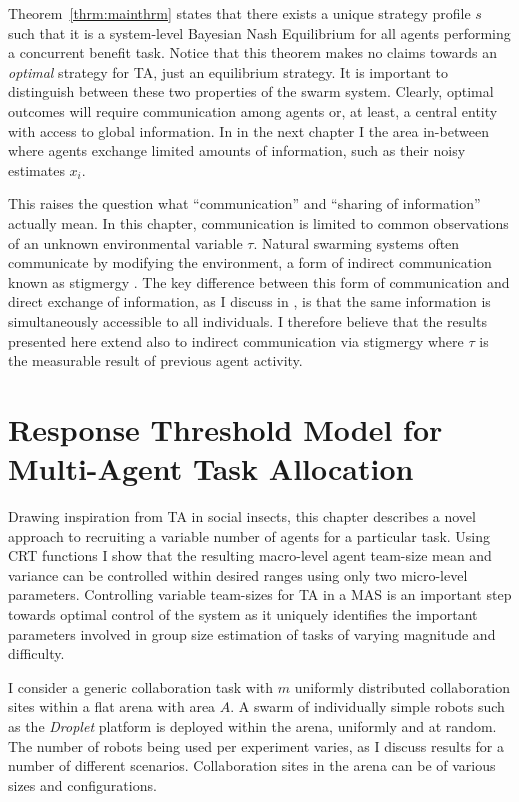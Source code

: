 \documentclass[12pt]{book}
\begin{document}
Theorem~\ref{thrm:mainthrm} states that there exists a unique strategy profile $s$ such that it is a system-level Bayesian Nash Equilibrium for all agents performing a concurrent benefit task. Notice that this theorem makes no claims towards an \emph{optimal} strategy for TA, just an equilibrium strategy. It is important to distinguish between these two properties of the swarm system. Clearly, optimal outcomes will require communication among agents or, at least, a central entity with access to global information. In in the next chapter I the area in-between where agents exchange limited amounts of information, such as their noisy estimates $x_i$.

This raises the question what ``communication'' and ``sharing of information'' actually mean. In this chapter, communication is limited to common observations of an unknown environmental variable $\tau$. Natural swarming systems often communicate by modifying the environment, a form of indirect communication known as stigmergy \cite{Grasse1959}. The key difference between this form of communication and direct exchange of information, as I discuss in \cite{Touri2014}, is that the same information is simultaneously accessible to all individuals. I therefore believe that the results presented here extend also to indirect communication via stigmergy where $\tau$ is the measurable result of previous agent activity.


\chapter{Response Threshold Model for Multi-Agent Task Allocation}\label{ch:resthmodel}
Drawing inspiration from TA in social insects, this chapter describes a novel approach to recruiting a variable number of agents for a particular task. Using CRT functions I show that the resulting macro-level agent team-size mean and variance can be controlled within desired ranges using only two micro-level parameters. Controlling variable team-sizes for TA in a MAS is an important step towards optimal control of the system as it uniquely identifies the important parameters involved in group size estimation of tasks of varying magnitude and difficulty. 

I consider a generic collaboration task with $m$ uniformly distributed collaboration sites within a flat arena with area $A$. A swarm of individually simple robots such as the \emph{Droplet} platform \cite{Farrow2014,Klingner2014} is deployed within the arena, uniformly and at random. The number of robots being used per experiment varies, as I discuss results for a number of different scenarios. Collaboration sites in the arena can be of various sizes and configurations.
\end{document}

